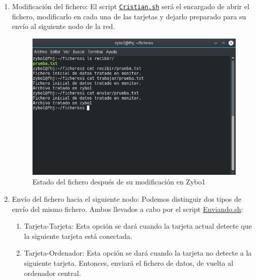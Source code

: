 \begin{enumerate}
	\item Modificación del fichero: El script \hyperlink{ScriptCristian}{\texttt{Cristian.sh}} será el encargado de abrir el fichero, modificarlo en cada una de las tarjetas y dejarlo preparado para su envío al siguiente nodo de la red.
	\begin{figure}[h]
		\centering
		\includegraphics[scale=0.5]{Metodologia/Pruebas/Fichero_en_Zybo1.png}
		\caption{Estado del fichero después de su modificación en Zybo1}
		\label{Estado del fichero después de su modificación en Zybo1}
	\end{figure}
\newpage
	\item Envío del fichero hacia el siguiente nodo: Podemos distinguir dos tipos de envío del mismo fichero. Ambos llevados a cabo por el script \hyperlink{ScriptEnviando}{Enviando.sh}:
	\begin{enumerate}
		\item Tarjeta-Tarjeta: Esta opción se dará cuando la tarjeta actual detecte que la siguiente tarjeta está conectada.
		\item Tarjeta-Ordenador: Esta opción se dará cuando la tarjeta no detecte a la siguiente tarjeta. Entonces, enviará el fichero de datos, de vuelta al ordenador central.
	\end{enumerate}


\end{enumerate}
